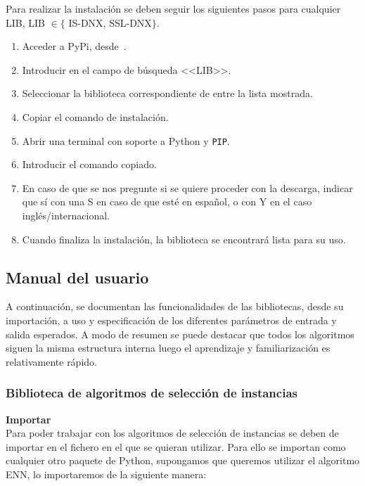 Para realizar la instalación se deben seguir los siguientes pasos para cualquier LIB, LIB $\in \lbrace$ IS-DNX, SSL-DNX$\rbrace$.

\begin{enumerate}
\item Acceder a PyPi, desde~\cite{PyPI}.
\item Introducir en el campo de búsqueda <<LIB>>.
\item Seleccionar la biblioteca correspondiente de entre la lista mostrada.
\item Copiar el comando de instalación.
\item Abrir una terminal con soporte a Python y \texttt{PIP}.
\item Introducir el comando copiado.
\item En caso de que se nos pregunte si se quiere proceder con la descarga, indicar que sí con una S en caso de que esté en español, o con Y en el caso inglés/internacional.
\item Cuando finaliza la instalación, la biblioteca se encontrará lista para su uso.
\end{enumerate}



\subsection{Manual del usuario}

A continuación, se documentan las funcionalidades de las bibliotecas, desde su importación, a uso y especificación de los diferentes parámetros de entrada y salida esperados. A modo de resumen se puede destacar que todos los algoritmos siguen la misma estructura interna luego el aprendizaje y familiarización es relativamente rápido.

\subsubsection{Biblioteca de algoritmos de selección de instancias}
\textbf{Importar}\\
Para poder trabajar con los algoritmos de selección de instancias se deben de importar en el fichero en el que se quieran utilizar. Para ello se importan como cualquier otro paquete de Python, supongamos que queremos utilizar el algoritmo ENN, lo importaremos de la siguiente manera:

